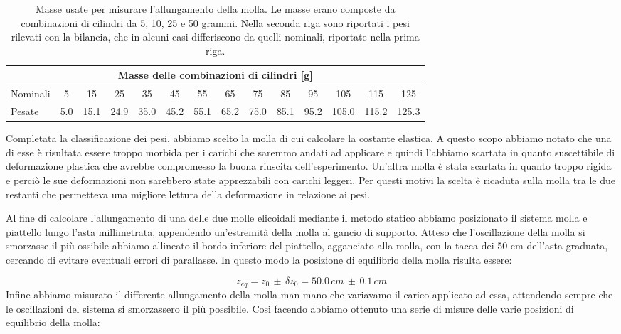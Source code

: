\begin{table}[tb]
    \centering
    \small
    \begin{tabular}{l | c c c c c c c c c c c c c}
        \multicolumn{14}{c}{Masse delle combinazioni di cilindri [g]} \\[1mm]
        \toprule
        Nominali & 5 & 15 & 25 & 35 & 45 & 55 & 65 & 75 & 85 & 95 & 105 & 115 & 125 \\
        Pesate & 5.0 & 15.1 & 24.9 & 35.0 & 45.2 & 55.1 & 65.2 & 75.0 & 85.1 & 95.2 & 105.0 & 115.2 & 125.3 \\
        \bottomrule
    \end{tabular}
    \caption{Masse usate per misurare l'allungamento della molla. Le masse erano composte da combinazioni
    di cilindri da 5, 10, 25 e 50 grammi. Nella seconda riga sono riportati i pesi rilevati con
    la bilancia, che in alcuni casi differiscono da quelli nominali, riportate nella prima riga.}
    \label{tab:masse}
\end{table}

Completata la classificazione dei pesi, abbiamo scelto la molla di cui calcolare la
costante elastica. A questo scopo abbiamo notato che una di esse è risultata essere troppo
morbida per i carichi che saremmo andati ad applicare e quindi l'abbiamo scartata in quanto suscettibile di deformazione plastica che avrebbe compromesso la buona riuscita dell'esperimento.
Un'altra molla è stata scartata in quanto troppo rigida e perciò le sue deformazioni non sarebbero state
apprezzabili con carichi leggeri. Per questi motivi la scelta è ricaduta sulla molla tra 
le due restanti che permetteva una migliore lettura della deformazione in relazione ai pesi.

Al fine di calcolare l'allungamento di una delle due molle elicoidali mediante il metodo statico abbiamo posizionato il sistema molla e piattello lungo l'asta millimetrata, appendendo un'estremità della molla al gancio di supporto. Atteso che l'oscillazione della molla si smorzasse il più ossibile abbiamo allineato il bordo inferiore del piattello, agganciato alla molla, con la tacca dei 50 cm dell'asta graduata, cercando di evitare eventuali errori di parallasse. In questo modo la posizione di equilibrio della molla risulta essere:

\begin{equation*}
	z_{eq} = z_0\,\pm\,\delta z_0 = 50.0\,cm\,\pm\,0.1\,cm
\end{equation*}
Infine abbiamo misurato il differente allungamento della molla man mano che variavamo il carico applicato ad essa, attendendo sempre che le oscillazioni del sistema si smorzassero il più possibile. Così facendo abbiamo ottenuto una serie di misure delle varie posizioni di equilibrio della molla:

